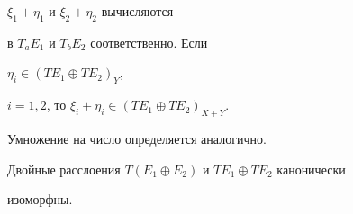 $\xi_1+\eta_1$ и $\xi_2+\eta_2$ вычисляются  


в $T_a E_1$ и $T_b E_2$ соответственно. Если 


$\eta_i\in(TE_1\oplus TE_2)_Y$, 


$i=1,2$, то $\xi_i+\eta_i\in(TE_1\oplus TE_2)_{X+Y}$. 


Умножение на число определяется аналогично. 


 


\begin{thms} 


Двойные расслоения $T(E_1\oplus E_2)$ и $TE_1\oplus TE_2$ канонически 


изоморфны. 


\end{thms} 


 


